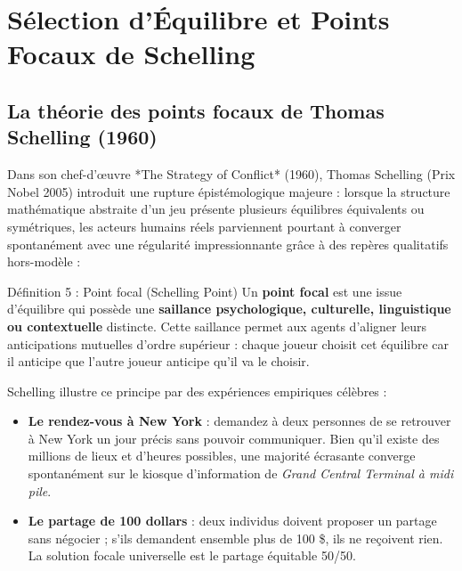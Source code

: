 \documentclass[11pt,a4paper]{article}
\begin{document}
\newpage

\section{Sélection d'Équilibre et Points Focaux de Schelling}\label{sec:schelling}

\subsection{La théorie des points focaux de Thomas Schelling (1960)}
Dans son chef-d'\oe uvre *The Strategy of Conflict* (1960), Thomas Schelling (Prix Nobel 2005) introduit une rupture épistémologique majeure : lorsque la structure mathématique abstraite d'un jeu présente plusieurs équilibres équivalents ou symétriques, les acteurs humains réels parviennent pourtant à converger spontanément avec une régularité impressionnante grâce à des repères qualitatifs hors-modèle :

\begin{propbox}{Définition 5 : Point focal (Schelling Point)}
Un \textbf{point focal} est une issue d'équilibre qui possède une \textbf{saillance psychologique, culturelle, linguistique ou contextuelle} distincte. Cette saillance permet aux agents d'aligner leurs anticipations mutuelles d'ordre supérieur : chaque joueur choisit cet équilibre car il anticipe que l'autre joueur anticipe qu'il va le choisir.
\end{propbox}

Schelling illustre ce principe par des expériences empiriques célèbres :
\begin{itemize}[leftmargin=1.5em]
    \item \textbf{Le rendez-vous à New York} : demandez à deux personnes de se retrouver à New York un jour précis sans pouvoir communiquer. Bien qu'il existe des millions de lieux et d'heures possibles, une majorité écrasante converge spontanément sur le kiosque d'information de \emph{Grand Central Terminal à midi pile}.
    \item \textbf{Le partage de 100 dollars} : deux individus doivent proposer un partage sans négocier ; s'ils demandent ensemble plus de 100 \$, ils ne reçoivent rien. La solution focale universelle est le partage équitable 50/50.
\end{itemize}
\end{document}
